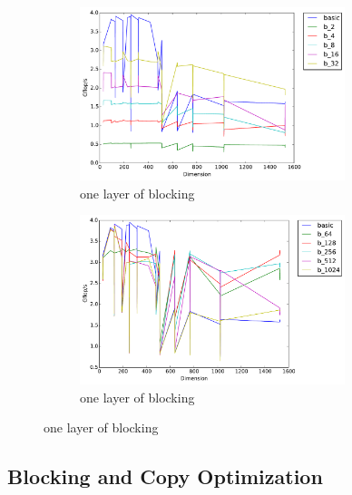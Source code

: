 \documentclass[12pt]{article}
\numberwithin{equation}{section}
\begin{document}
\begin{figure}[!ht]
   \begin{subfigure}
      \centering
        \begin{center}
      \includegraphics[width=0.85\textwidth] {timing_b_1}
        \end{center}
      \label{aload0}
      \caption{one layer of blocking}
  \end{subfigure}
  \begin{subfigure}
      \centering
        \begin{center}
      \includegraphics[width=0.85\textwidth] {timing_b_2}
        \end{center}
      \label{aload1}
      \caption{one layer of blocking}
  \end{subfigure}

\end{figure}

\subsection{Blocking and Copy Optimization}
\end{document}
